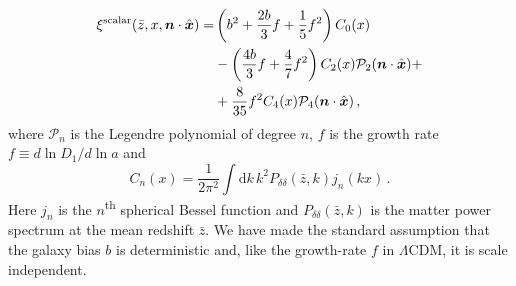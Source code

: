 \documentclass[a4paper,twocolumn,aps,prd,nolongbibliography,superscriptaddress,showpacs,showkeys,amsmath,amssymb,floatfix,nofootinbib]{revtex4-1}
\renewcommand{\[}{\begin{equation}}
\renewcommand{\]}{\end{equation}}
\begin{document}
\begin{align}
\xi^\text{scalar}(\bar z, x,\boldsymbol{n}\cdot\hat{\boldsymbol{x}}) =& \left(b^2+\frac{2b}{3}f+\frac{1}{5}f^2\right)C_{0}(x) \label{xiscalar}\\
&-\left(\frac{4b}{3}f+\frac{4}{7}f^{2}\right)C_{2}(x)\mathcal{P}_{2}(\boldsymbol{n}\cdot\hat{\boldsymbol{x}}) + \notag\\
& +\frac{8}{35}f^{2}C_{4}(x)\mathcal{P}_{4}(\boldsymbol{n}\cdot\hat{\boldsymbol{x}}) \,, \notag
\end{align}
where $\mathcal{P}_n$ is the Legendre polynomial of degree $n$, $f$ is the growth rate $f\equiv d\ln D_1/d\ln a$ and 
\begin{equation}
C_{n}(x)=\frac{1}{2\pi^{2}}\int\mathrm{d}k\,k^{2}P_{\delta\delta}(\bar z, k)j_{n}(kx) \,.
\end{equation}
Here $j_n$ is the $n$\textsuperscript{th} spherical Bessel function and $P_{\delta\delta}(\bar z, k)$ is the matter power spectrum at the mean redshift $\bar z$. We have made the standard assumption that the galaxy bias $b$ is deterministic and, like the growth-rate $f$ in $\Lambda$CDM, it is scale independent.
\end{document}
